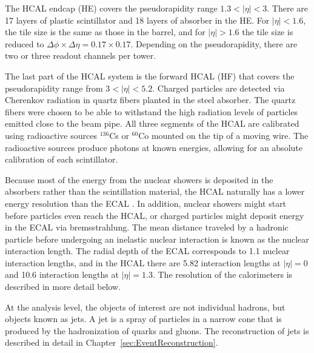 The HCAL endcap (HE) covers the pseudorapidity range $1.3 < |\eta| < 3$. There are 17 layers of plastic scintillator and 18 layers of absorber in the HE. For $|\eta| < 1.6$, the tile size is the same as those in the barrel, and for $|\eta| >1.6$ the tile size is reduced to $\Delta\phi \times \Delta\eta = 0.17 \times 0.17$. Depending on the pseudorapidity, there are two or three readout channels per tower.
 
The last part of the HCAL system is the forward HCAL (HF) that covers the pseudorapidity range from $3 < |\eta| < 5.2$. Charged particles are detected via Cherenkov radiation in quartz fibers planted in the steel absorber. The quartz fibers were chosen to be able to withstand the high radiation levels of particles emitted close to the beam pipe. 
All three segments of the HCAL are calibrated using radioactive sources $^{136}$Cs or $^{60}$Co mounted on the tip of a moving wire. The radioactive sources produce photons at known energies, allowing for an absolute calibration of each scintillator. 

Because most of the energy from the nuclear showers is deposited in the absorbers rather than the scintillation material, 
the HCAL naturally has a lower energy resolution than the ECAL . In addition, nuclear showers might start 
before particles even reach the HCAL, or charged particles might deposit energy in the ECAL via bremsstrahlung. 
The mean distance traveled by a hadronic particle before undergoing 
an inelastic nuclear interaction is known as the nuclear interaction length. 
The radial depth of the ECAL corresponds to 1.1 nuclear interaction lengths, and
in the HCAL there are 5.82 interaction lengths at $|\eta|=0$ and 10.6 interaction lengths at $|\eta|=1.3$. 
The resolution of the calorimeters is described in more detail below.

At the analysis level, the objects of interest are not individual hadrons, but objects known as jets. A jet is a spray of particles in a narrow cone that is produced by the hadronization of quarks and gluons. The reconstruction of jets is described in detail in Chapter~\ref{sec:EventReconstruction}.



